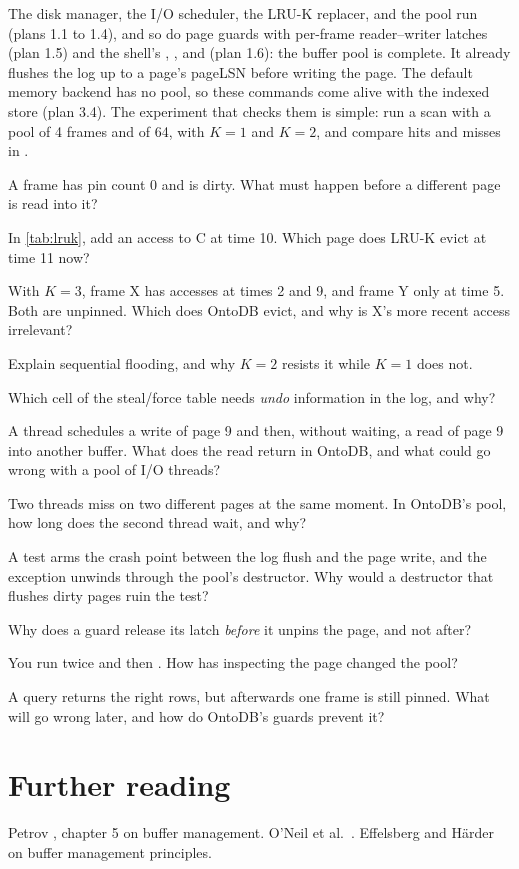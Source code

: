 \begin{status}
The disk manager, the I/O scheduler, the LRU-K replacer, and the pool run
(plans 1.1 to 1.4), and so do page guards with per-frame reader--writer latches
(plan 1.5) and the shell's , ,
and  (plan 1.6): the buffer pool is complete. It
already flushes the log up to a page's pageLSN before writing the page. The
default memory backend has no pool, so these commands come alive with the
indexed store (plan 3.4).
The experiment that checks them is simple: run a scan with a pool of 4 frames
and of 64, with $K=1$ and $K=2$, and compare hits and misses in .
\end{status}

\begin{checkyourself}
\item A frame has pin count 0 and is dirty. What must happen before a different page is read into it?
\item In \cref{tab:lruk}, add an access to C at time 10. Which page does LRU-K evict at time 11 now?
\item With $K = 3$, frame X has accesses at times 2 and 9, and frame Y only at time 5. Both are unpinned. Which does OntoDB evict, and why is X's more recent access irrelevant?
\item Explain sequential flooding, and why $K = 2$ resists it while $K = 1$ does not.
\item Which cell of the steal/force table needs \emph{undo} information in the log, and why?
\item A thread schedules a write of page 9 and then, without waiting, a read of page 9 into another buffer. What does the read return in OntoDB, and what could go wrong with a pool of I/O threads?
\item Two threads miss on two different pages at the same moment. In OntoDB's pool, how long does the second thread wait, and why?
\item A test arms the crash point between the log flush and the page write, and the exception unwinds through the pool's destructor. Why would a destructor that flushes dirty pages ruin the test?
\item Why does a guard release its latch \emph{before} it unpins the page, and not after?
\item You run  twice and then . How has inspecting the page changed the pool?
\item A query returns the right rows, but afterwards one frame is still pinned. What will go wrong later, and how do OntoDB's guards prevent it?
\end{checkyourself}

\section*{Further reading}
Petrov \cite{petrov}, chapter 5 on buffer management. O'Neil et al.\ \cite{lruk}.
Effelsberg and H\"arder \cite{effelsberg} on buffer management principles.
